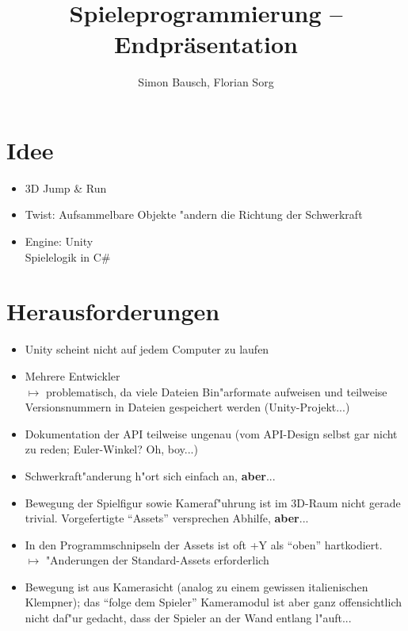 \documentclass[landscape,compress,table]{beamer}
\title{Spieleprogrammierung -- Endpräsentation}
\author{Simon Bausch, Florian Sorg}
\institute{Hochschule Aalen}
\begin{document}
\begin{frame}
	\titlepage
\end{frame}

\begin{frame}
	\tableofcontents
\end{frame}

\section{Idee}
\begin{frame}
	\begin{itemize}
		\item
			3D Jump \& Run
		\item
			Twist: Aufsammelbare Objekte "andern die
			Richtung der Schwerkraft
		\item
			Engine: Unity\\
			Spielelogik in C\#
	\end{itemize}
\end{frame}

\section{Herausforderungen}
\begin{frame}
	\begin{itemize}
		\item
			Unity scheint nicht auf jedem Computer
			zu laufen
		\item
			Mehrere Entwickler\\
			$\mapsto$ problematisch, da viele Dateien
			Bin"arformate aufweisen und teilweise
			Versionsnummern in Dateien gespeichert
			werden (Unity-Projekt...)
		\item
			Dokumentation der API teilweise ungenau
			(vom API-Design selbst gar nicht zu reden;
			Euler-Winkel? Oh, boy...)
		\item
			Schwerkraft"anderung h"ort sich einfach
			an, \textbf{aber}...
	\end{itemize}
\end{frame}

\begin{frame}
	\begin{itemize}
		\item
			Bewegung der Spielfigur sowie Kameraf"uhrung
			ist im 3D-Raum nicht gerade trivial.
			Vorgefertigte ``Assets'' versprechen Abhilfe,
			\textbf{aber}...
		\item
			In den Programmschnipseln der Assets ist
			oft +Y als ``oben'' hartkodiert.\\
			$\mapsto$ "Anderungen der Standard-Assets
			erforderlich
		\item
			Bewegung ist aus Kamerasicht (analog zu
			einem gewissen italienischen Klempner);
			das ``folge dem Spieler'' Ka\-me\-ra\-mo\-dul
			ist aber ganz offensichtlich nicht
			daf"ur gedacht, dass der Spieler an der
			Wand entlang l"auft...
	\end{itemize}
\end{frame}
\end{document}
